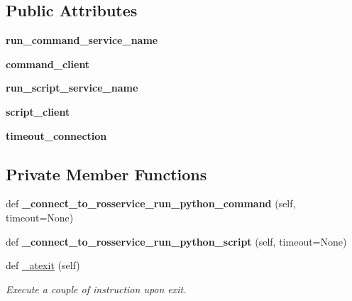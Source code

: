 \subsection*{Public Attributes}
\begin{DoxyCompactItemize}
\item 
\mbox{\label{classros_1_1ros__client_1_1RosPythonInterpreter_a36cd3a0e3570dbfde5ced42607bb9367}} 
{\bfseries run\+\_\+command\+\_\+service\+\_\+name}
\item 
\mbox{\label{classros_1_1ros__client_1_1RosPythonInterpreter_aea957df856e6fe9ad8c471b2c382ebab}} 
{\bfseries command\+\_\+client}
\item 
\mbox{\label{classros_1_1ros__client_1_1RosPythonInterpreter_ab93db3a217d257a6c50d944bd1edb43a}} 
{\bfseries run\+\_\+script\+\_\+service\+\_\+name}
\item 
\mbox{\label{classros_1_1ros__client_1_1RosPythonInterpreter_a17bb95376765347cd27c645b3399f071}} 
{\bfseries script\+\_\+client}
\item 
\mbox{\label{classros_1_1ros__client_1_1RosPythonInterpreter_abce1abc9d628db983be2ed02522550d1}} 
{\bfseries timeout\+\_\+connection}
\end{DoxyCompactItemize}
\subsection*{Private Member Functions}
\begin{DoxyCompactItemize}
\item 
\mbox{\label{classros_1_1ros__client_1_1RosPythonInterpreter_a443b997ed6c8f6a0bea05aae15403686}} 
def {\bfseries \+\_\+connect\+\_\+to\+\_\+rosservice\+\_\+run\+\_\+python\+\_\+command} (self, timeout=None)
\item 
\mbox{\label{classros_1_1ros__client_1_1RosPythonInterpreter_a051256d44254766bd342d5f68f30b454}} 
def {\bfseries \+\_\+connect\+\_\+to\+\_\+rosservice\+\_\+run\+\_\+python\+\_\+script} (self, timeout=None)
\item 
\mbox{\label{classros_1_1ros__client_1_1RosPythonInterpreter_a817a0c056aeeba19895cb8c111c370df}} 
def \hyperlink{classros_1_1ros__client_1_1RosPythonInterpreter_a817a0c056aeeba19895cb8c111c370df}{\+\_\+atexit} (self)
\begin{DoxyCompactList}\small\item\em Execute a couple of instruction upon exit. \end{DoxyCompactList}\end{DoxyCompactItemize}
